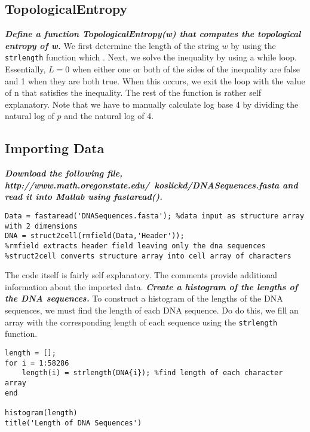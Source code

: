 \documentclass{article}
\begin{document}
\subsection{TopologicalEntropy}
\textbf{\textit{Define a function TopologicalEntropy(w) that computes the topological entropy of w.}}
\newline
\newline
We first determine the length of the string $w$ by using the \texttt{strlength} function which \cite{4}.
Next, we solve the inequality by using a while loop.
Essentially, $L = 0$ when either one or both of the sides of the inequality are false and 1 when they are both true.
When this occurs, we exit the loop with the value of n that satisfies the inequality.
The rest of the function is rather self explanatory. 
Note that we have to manually calculate log base 4 by dividing the natural log of $p$ and the natural log of 4.
\newline


\subsection{Importing Data}
\textbf{\textit{Download the following file, http://www.math.oregonstate.edu/~koslickd/DNASequences.fasta and read it into Matlab using fastaread().}}
\newline
\begin{lstlisting}
Data = fastaread('DNASequences.fasta'); %data input as structure array with 2 dimensions
DNA = struct2cell(rmfield(Data,'Header'));
%rmfield extracts header field leaving only the dna sequences
%struct2cell converts structure array into cell array of characters
\end{lstlisting}
\noindent The code itself is fairly self explanatory.
The comments provide additional information about the imported data.
\newline
\newline
\newline
\textbf{\textit{Create a histogram of the lengths of the DNA sequences.}}
\newline
\newline
To construct a histogram of the lengths of the DNA sequences, we must find the length of each DNA sequence.
Do do this, we fill an array with the corresponding length of each sequence using the \texttt{strlength} function.
\newline
\begin{lstlisting}
length = [];
for i = 1:58286
    length(i) = strlength(DNA{i}); %find length of each character array
end

histogram(length)
title('Length of DNA Sequences')
\end{lstlisting}
\end{document}
